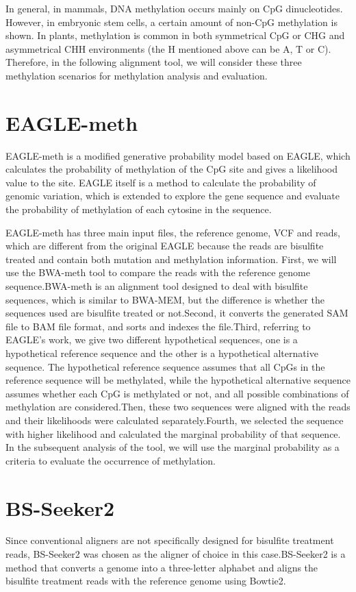 \documentclass{PHlab-thesis}
\begin{document}
\par
In general, in mammals, DNA methylation occurs mainly on CpG dinucleotides. However, in embryonic stem cells, a certain amount of non-CpG methylation is shown. In plants, methylation is common in both symmetrical CpG or CHG and asymmetrical CHH environments (the H mentioned above can be A, T or C). Therefore, in the following alignment tool, we will consider these three methylation scenarios for methylation analysis and evaluation.

\section{EAGLE-meth}
EAGLE-meth is a modified generative probability model based on EAGLE, which calculates the probability of methylation of the CpG site and gives a likelihood value to the site. EAGLE itself is a method to calculate the probability of genomic variation, which is extended to explore the gene sequence and evaluate the probability of methylation of each cytosine in the sequence.

\par
EAGLE-meth has three main input files, the reference genome, VCF and reads, which are different from the original EAGLE because the reads are bisulfite treated and contain both mutation and methylation information. First, we will use the BWA-meth tool to compare the reads with the reference genome sequence.BWA-meth is an alignment tool designed to deal with bisulfite sequences, which is similar to BWA-MEM, but the difference is whether the sequences used are bisulfite treated or not.Second, it converts the generated SAM file to BAM file format, and sorts and indexes the file.Third, referring to EAGLE's work, we give two different hypothetical sequences, one is a hypothetical reference sequence and the other is a hypothetical alternative sequence. The hypothetical reference sequence assumes that all CpGs in the reference sequence will be methylated, while the hypothetical alternative sequence assumes whether each CpG is methylated or not, and all possible combinations of methylation are considered.Then, these two sequences were aligned with the reads and their likelihoods were calculated separately.Fourth, we selected the sequence with higher likelihood and calculated the marginal probability of that sequence. In the subsequent analysis of the tool, we will use the marginal probability as a criteria to evaluate the occurrence of methylation.

\section{BS-Seeker2}
Since conventional aligners are not specifically designed for bisulfite treatment reads, BS-Seeker2 was chosen as the aligner of choice in this case.BS-Seeker2 is a method that converts a genome into a three-letter alphabet and aligns the bisulfite treatment reads with the reference genome using Bowtie2.
\end{document}
